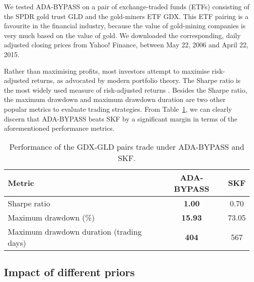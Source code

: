 We tested ADA-BYPASS on a pair of exchange-traded funds (ETFs) consisting of the SPDR gold trust GLD and the gold-miners ETF GDX. This ETF pairing is a favourite in the financial industry, because the value of gold-mining companies is very much based on the value of gold. We downloaded the corresponding, daily adjusted closing prices from Yahoo! Finance, between May 22, 2006 and April 22, 2015.

Rather than maximising profits, most investors attempt to maximise risk-adjusted returns, as advocated by modern portfolio theory. The Sharpe ratio is the most widely used measure of risk-adjusted returns \citep{sharpe}. Besides the Sharpe ratio, the maximum drawdown and maximum drawdown duration are two other popular metrics to evaluate trading strategies. From Table~\ref{tab:statarb}, we can clearly discern that ADA-BYPASS beats SKF by a significant margin in terms of the aforementioned performance metrics.
\begin{table}[t]
\caption{Performance of the GDX-GLD pairs trade under ADA-BYPASS and SKF.}
\label{tab:statarb}
\centering
  \begin{tabular}{lcc}
    \toprule
    Metric    & ADA-BYPASS     & SKF \\
    \midrule
    Sharpe ratio & \textbf{1.00}  & 0.70     \\
    Maximum drawdown (\%)     & \textbf{15.93} & 73.05      \\
    Maximum drawdown duration (trading days)     & \textbf{404}       & 567  \\
    \bottomrule
  \end{tabular}
\end{table}

\begin{mccorrection}
\subsection{Impact of different priors}
\end{mccorrection}

